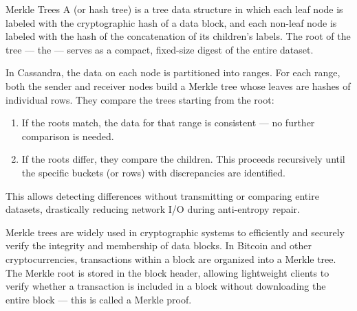 \begin{note}{Merkle Trees}
    A  (or hash tree) is a tree data structure in which each leaf node is labeled with the cryptographic hash of a data block, and each non-leaf node is labeled with the hash of the concatenation of its children's labels. The root of the tree --- the  --- serves as a compact, fixed-size digest of the entire dataset.

    \begin{center}
    \end{center}
    In Cassandra, the data on each node is partitioned into ranges. For each range, both the sender and receiver nodes build a Merkle tree whose leaves are hashes of individual rows. They compare the trees starting from the root:
    \begin{enumerate}
        \item If the roots match, the data for that range is consistent --- no further comparison is needed.
        \item If the roots differ, they compare the children. This proceeds recursively until the specific buckets (or rows) with discrepancies are identified.
    \end{enumerate}
    This allows detecting differences without transmitting or comparing entire datasets, drastically reducing network I/O during anti-entropy repair.

    Merkle trees are widely used in cryptographic systems to efficiently and securely verify the integrity and membership of data blocks. In Bitcoin and other cryptocurrencies, transactions within a block are organized into a Merkle tree. The Merkle root is stored in the block header, allowing lightweight clients to verify whether a transaction is included in a block without downloading the entire block --- this is called a Merkle proof.
\end{note}

